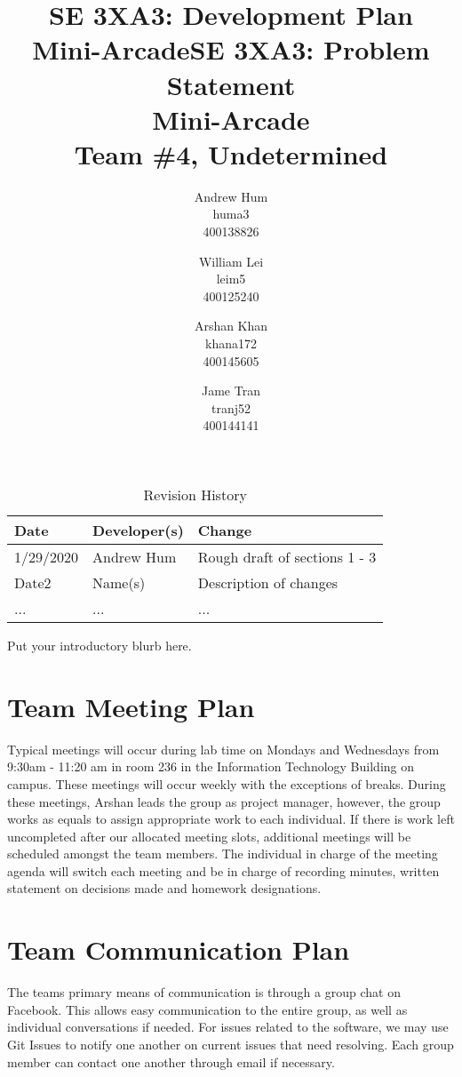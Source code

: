 \documentclass{article}
\title{SE 3XA3: Development Plan\\Mini-Arcade}
\title{SE 3XA3: Problem Statement \\ Mini-Arcade \\{\large Team \#4, Undetermined}}
\author{Andrew Hum \\ huma3 \\ 400138826 \and
		William Lei \\ leim5 \\ 400125240 \and
		Arshan Khan \\ khana172 \\ 400145605 \and
		Jame Tran \\ tranj52 \\ 400144141
}
\date{}
\begin{document}
\begin{table}[hp]
\caption{Revision History} \label{TblRevisionHistory}
\begin{tabularx}{\textwidth}{llX}
\toprule
\textbf{Date} & \textbf{Developer(s)} & \textbf{Change}\\
\midrule
1/29/2020 & Andrew Hum & Rough draft of sections 1 - 3\\
Date2 & Name(s) & Description of changes\\
... & ... & ...\\
\bottomrule
\end{tabularx}
\end{table}

\newpage

\maketitle

Put your introductory blurb here.

\section{Team Meeting Plan}

Typical meetings will occur during lab time on Mondays and Wednesdays from 9:30am - 11:20 am in room 236 in the Information Technology Building on campus. These meetings will occur weekly with the exceptions of breaks. During these meetings, Arshan leads the group as project manager, however, the group works as equals to assign appropriate work to each individual. If there is work left uncompleted after our allocated meeting slots, additional meetings will be scheduled amongst the team members. The individual in charge of the meeting agenda will switch each meeting and be in charge of recording minutes, written statement on decisions made and homework designations.

\section{Team Communication Plan}

The teams primary means of communication is through a group chat on Facebook. This allows easy communication to the entire group, as well as individual conversations if needed. For issues related to the software, we may use Git Issues to notify one another on current issues that need resolving. Each group member can contact one another through email if necessary.
\end{document}
